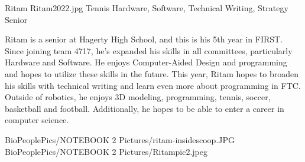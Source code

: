\insertbio
{Ritam}
{Ritam2022.jpg}
{Tennis}
{Hardware, Software, Technical Writing, Strategy}
{Senior}
{
Ritam is a senior at Hagerty High School, and this is his 5th year in FIRST. Since joining team 4717, he’s expanded his skills in all committees, particularly Hardware and Software. He enjoys Computer-Aided Design and programming and hopes to utilize these skills in the future. This year, Ritam hopes to broaden his skills with technical writing and learn even more about programming in FTC. Outside of robotics, he enjoys 3D modeling, programming, tennis, soccer, basketball and football. Additionally, he hopes to be able to enter a career in computer science.

}
{BioPeoplePics/NOTEBOOK 2 Pictures/ritam-insidescoop.JPG}
{BioPeoplePics/NOTEBOOK 2 Pictures/Ritampic2.jpeg}
